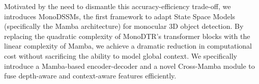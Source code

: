 Motivated by the need to dismantle this accuracy-efficiency trade-off, we introduces MonoDSSMs, the first framework to adapt State Space Models (specifically the Mamba architecture) for monocular 3D object detection. By replacing the quadratic complexity of MonoDTR’s transformer blocks with the linear complexity of Mamba, we achieve a dramatic reduction in computational cost without sacrificing the ability to model global context. We specifically introduce a Mamba-based encoder-decoder and a novel Cross-Mamba module to fuse depth-aware and context-aware features efficiently.